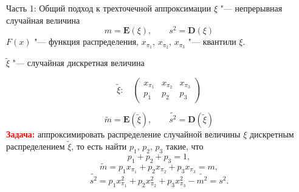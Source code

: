 \documentclass[ucs, notheorems, handout]{beamer}
\begin{document}
\begin{frame}{Часть 1: Общий подход к трехточечной аппроксимации}
	$\xi$ "--- непрерывная случайная величина  \[m = \mathbf E(\xi), \quad\quad s^{2} = \mathbf D(\xi)\]  $F(x)$ "--- функция распределения,
	$x_{\pi_{1}}$, $x_{\pi_{2}}$, $x_{\pi_{3}}$ "--- квантили $\xi$.
	
	$\tilde{\xi}$ "--- случайная дискретная величина 
	
	\[\tilde{\xi}:\quad\begin{pmatrix} 
		x_{\pi_{1}}&x_{\pi_{2}}&x_{\pi_{3}}\\ 
		p_{1} &  p_{2}  & p_{3}
	\end{pmatrix}\]
	
	\[\tilde{m} = \mathbf E(\tilde{\xi}), \quad\quad \tilde{s^{2}} = \mathbf D(\tilde{\xi})\]
	\textcolor{red}{\textbf{Задача:}} аппроксимировать распределение случайной величины $\xi$ дискретным распределением $\tilde{\xi}$, то есть найти $p_{1}$, $p_{2}$, $p_{3}$ такие, что 
	\begin{equation*}
		p_{1} + p_{2} + p_{3} = 1, \label{1}
	\end{equation*}
	\begin{equation*}
		\tilde{m} = p_{1}x_{\pi_{1}} + p_{2}x_{\pi_{2}} + p_{3}x_{\pi_{3}} = m, \label{2}
	\end{equation*}
	\begin{equation*}
		\tilde{s^{2}} = p_{1} x_{\pi_{1}}^{2} + p_{2} x_{\pi_{2}}^{2} + p_{3} x_{\pi_{3}}^{2} - \tilde{m^{2}} = s^{2}. \label{3}
	\end{equation*}
	
	
\end{frame}
\end{document}
